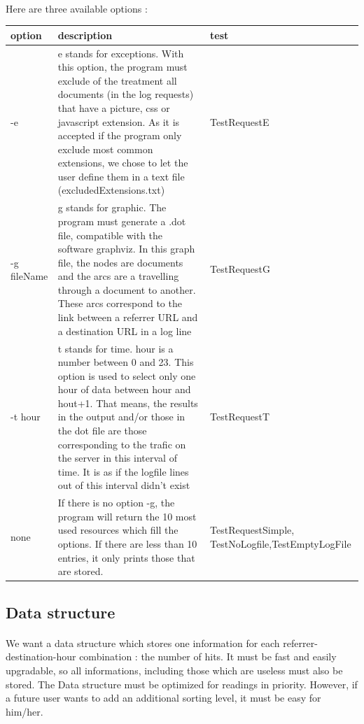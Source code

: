 \documentclass[a4paper, 12pts]{article}
\begin{document}
\paragraph{} 
 Here are three available options :
\begin{center}
   \begin{tabular}{| p{2cm} | p{8cm} | p{3.5cm} |}
	\hline
	option & description & test\\ \hline
	-e & e stands for exceptions. With this option, the program must exclude of the treatment all documents (in the log requests) that have a picture, css or javascript extension. As it is accepted if the program only exclude most common extensions, we chose to let the user define them in a text file (excludedExtensions.txt) & TestRequestE\\ \hline
	-g fileName & g stands for graphic. The program must generate a .dot file, compatible with the software graphviz. In this graph file, the nodes are documents and the arcs are a travelling through a document to another. These arcs correspond to the link between a referrer URL and a destination URL in a log line & TestRequestG\\ \hline
	-t hour & t stands for time. hour is a number between 0 and 23. This option is used to select only one hour of data between hour and hout+1. That means, the results in the output and/or those in the dot file are those corresponding to the trafic on the server in this interval of time. It is as if the logfile lines out of this interval didn't exist & TestRequestT\\ \hline
	none & If there is no option -g, the program will return the 10 most used resources which fill the options. If there are less than 10 entries, it only prints those that are stored. & TestRequestSimple, TestNoLogfile,\linebreak TestEmptyLogFile\\ \hline
   \end{tabular}
\end{center}

\subsection{Data structure}
\paragraph{}
 We want a data structure which stores one information for each referrer-destination-hour combination : the number of hits. It must be fast and easily upgradable, so all informations, including those which are useless must also be stored.
 The Data structure must be optimized for readings in priority. However, if a future user wants to add an additional sorting level, it must be easy for him/her.
\end{document}
